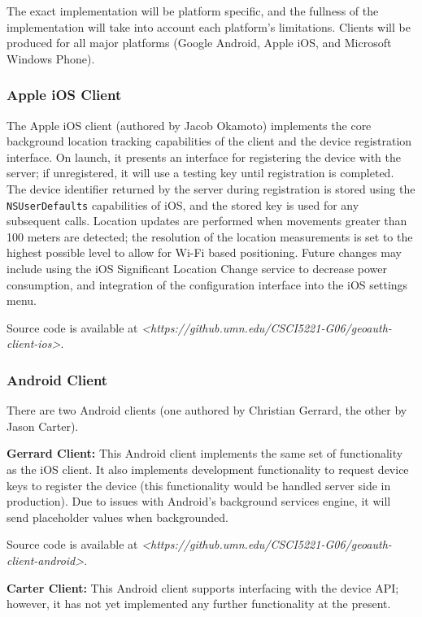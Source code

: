 \documentclass[11pt]{article} %
\begin{document}
The exact implementation will be platform specific, and the fullness of the implementation will take into account each platform's limitations. Clients will be produced for all major platforms (Google Android, Apple iOS, and Microsoft Windows Phone).

\subsubsection{Apple iOS Client}
The Apple iOS client (authored by Jacob Okamoto) implements the core background location tracking capabilities of the client and the device registration interface. On launch, it presents an interface for registering the device with the server; if unregistered, it will use a testing key until registration is completed. The device identifier returned by the server during registration is stored using the \texttt{NSUserDefaults} capabilities of iOS, and the stored key is used for any subsequent calls. Location updates are performed when movements greater than 100 meters are detected; the resolution of the location measurements is set to the highest possible level to allow for Wi-Fi based positioning. Future changes may include using the iOS Significant Location Change service to decrease power consumption, and integration of the configuration interface into the iOS settings menu.

Source code is available at \textit{<https://github.umn.edu/CSCI5221-G06/geoauth-client-ios>}.

\subsubsection{Android Client}
There are two Android clients (one authored by Christian Gerrard, the other by Jason Carter).

\textbf{Gerrard Client:} This Android client implements the same set of functionality as the iOS client. It also implements development functionality to request device keys to register the device (this functionality would be handled server side in production). Due to issues with Android's background services engine, it will send placeholder values when backgrounded.

Source code is available at \textit{<https://github.umn.edu/CSCI5221-G06/geoauth-client-android>}.

\textbf{Carter Client:} This Android client supports interfacing with the device API; however, it has not yet implemented any further functionality at the present.
\end{document}
